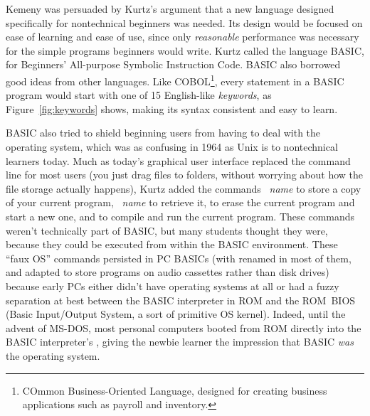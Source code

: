 Kemeny was persuaded by Kurtz's argument that a new language 
designed specifically for nontechnical beginners was needed.
Its design would be focused on ease of learning
and ease of use, since only \emph{reasonable} performance was necessary
for the simple programs beginners would write.
Kurtz called the language BASIC, for Beginners' All-purpose Symbolic
Instruction Code.
BASIC also  borrowed good ideas from other languages.
Like COBOL\footnote{COmmon Business-Oriented Language, designed for creating
business applications such as payroll and inventory.}, every statement in a BASIC
program would start with one of 15 English-like \emph{keywords}, as Figure~\ref{fig:keywords} shows,
making its syntax consistent and easy
to learn.


BASIC also tried to shield beginning users from having to deal with
the operating system, which was as confusing in 1964 as Unix is to
nontechnical learners today.
Much as today's graphical user interface replaced the command line for
most users (you just drag files to folders, without worrying about how
the file storage actually happens), Kurtz added the commands
~\emph{name} to store a copy of your current program,
~\emph{name} to retrieve it,  to erase the current
program and start a new one, and  to compile and run the
current program.
These commands weren't technically part of BASIC, but many students
thought they were, because they could be executed from within the
BASIC environment.
These ``faux OS'' commands persisted in PC BASICs (with 
renamed  in most of them, and adapted to store programs on
audio cassettes rather than disk drives) because early PCs either didn't have
operating systems at all or had a fuzzy separation at best between the
BASIC interpreter in ROM and the ROM~BIOS (Basic Input/Output System,
a sort of primitive OS kernel).
Indeed, until the advent of MS-DOS, most personal computers booted
from ROM directly into the BASIC interpreter's , giving
the newbie learner the impression that BASIC \emph{was} the operating
system.

